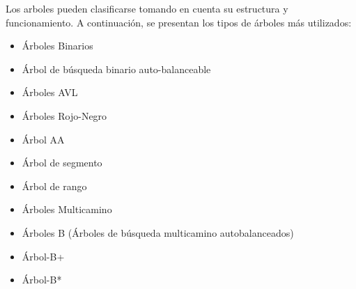 Los arboles pueden clasificarse tomando en cuenta su estructura y funcionamiento. A
continuación, se presentan los tipos de árboles más utilizados:

\begin{itemize}
	\item Árboles Binarios
	\item Árbol de búsqueda binario auto-balanceable
	\item Árboles AVL
	\item Árboles Rojo-Negro
	\item Árbol AA
	\item Árbol de segmento
	\item Árbol de rango
	\item Árboles Multicamino
	\item Árboles B (Árboles de búsqueda multicamino autobalanceados)
	\item Árbol-B+
	\item Árbol-B*
\end{itemize}